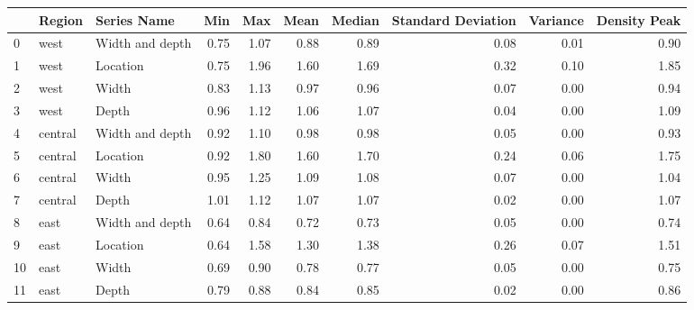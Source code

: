 \begin{tabular}{lllrrrrrrr}
\toprule
{} &   Region &      Series Name &   Min &   Max &  Mean &  Median &  Standard Deviation &  Variance &  Density Peak \\
\midrule
0  &     west &  Width and depth &  0.75 &  1.07 &  0.88 &    0.89 &                0.08 &      0.01 &          0.90 \\
1  &     west &         Location &  0.75 &  1.96 &  1.60 &    1.69 &                0.32 &      0.10 &          1.85 \\
2  &     west &            Width &  0.83 &  1.13 &  0.97 &    0.96 &                0.07 &      0.00 &          0.94 \\
3  &     west &            Depth &  0.96 &  1.12 &  1.06 &    1.07 &                0.04 &      0.00 &          1.09 \\
4  &  central &  Width and depth &  0.92 &  1.10 &  0.98 &    0.98 &                0.05 &      0.00 &          0.93 \\
5  &  central &         Location &  0.92 &  1.80 &  1.60 &    1.70 &                0.24 &      0.06 &          1.75 \\
6  &  central &            Width &  0.95 &  1.25 &  1.09 &    1.08 &                0.07 &      0.00 &          1.04 \\
7  &  central &            Depth &  1.01 &  1.12 &  1.07 &    1.07 &                0.02 &      0.00 &          1.07 \\
8  &     east &  Width and depth &  0.64 &  0.84 &  0.72 &    0.73 &                0.05 &      0.00 &          0.74 \\
9  &     east &         Location &  0.64 &  1.58 &  1.30 &    1.38 &                0.26 &      0.07 &          1.51 \\
10 &     east &            Width &  0.69 &  0.90 &  0.78 &    0.77 &                0.05 &      0.00 &          0.75 \\
11 &     east &            Depth &  0.79 &  0.88 &  0.84 &    0.85 &                0.02 &      0.00 &          0.86 \\
\bottomrule
\end{tabular}
